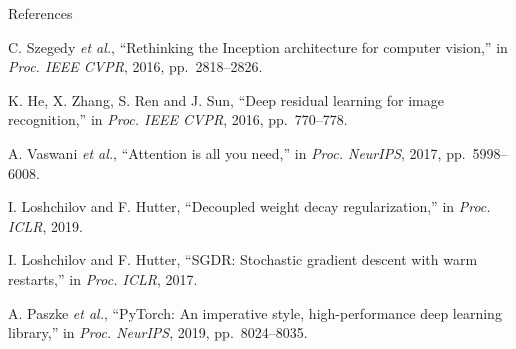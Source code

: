 \documentclass{article}
\begin{document}
\begin{tcbraster}[raster columns=2,raster equal height=rows,raster column skip=8mm,raster after skip=0mm,raster force size=false]
\begin{psec}[after skip=0pt,width=0.695\linewidth,fontupper=\fontsize{12}{14.2}\selectfont,top=3mm,bottom=3mm]{References}
\begin{enumerate}[label={[\arabic*]},leftmargin=2.1em,itemsep=0pt,topsep=0pt]
\item C. Szegedy \textit{et al.}, ``Rethinking the Inception architecture for computer vision,'' in \textit{Proc. IEEE CVPR}, 2016, pp.~2818--2826.
\item K. He, X. Zhang, S. Ren and J. Sun, ``Deep residual learning for image recognition,'' in \textit{Proc. IEEE CVPR}, 2016, pp.~770--778.
\item A. Vaswani \textit{et al.}, ``Attention is all you need,'' in \textit{Proc. NeurIPS}, 2017, pp.~5998--6008.
\item I. Loshchilov and F. Hutter, ``Decoupled weight decay regularization,'' in \textit{Proc. ICLR}, 2019.
\item I. Loshchilov and F. Hutter, ``SGDR: Stochastic gradient descent with warm restarts,'' in \textit{Proc. ICLR}, 2017.
\item A. Paszke \textit{et al.}, ``PyTorch: An imperative style, high-performance deep learning library,'' in \textit{Proc. NeurIPS}, 2019, pp.~8024--8035.
\end{enumerate}
\end{psec}
\end{tcbraster}
\end{document}
